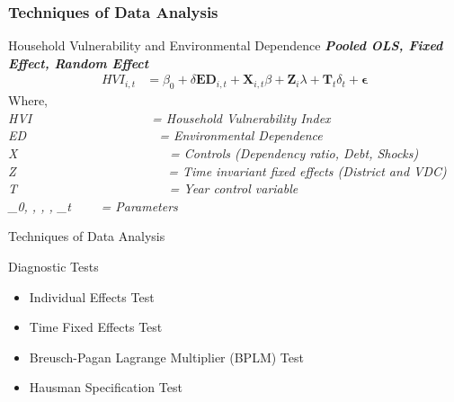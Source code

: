 \documentclass{beamer}
\begin{document}
	\begin{frame}
		\frametitle{Techniques of Data Analysis}
		\begin{block}{Household Vulnerability and Environmental Dependence}
			\textbf{\textit{Pooled OLS, Fixed Effect, Random Effect}}
			\begin{align}
				\mathit{HVI}_{i,t} &= \beta_{0} + \delta \mathit{\mathbf{ED}_{i,t}} + \mathbf{X}_{i,t} \beta + \mathbf{Z}_i \lambda + \mathbf{T}_t \delta_t + \boldsymbol{\epsilon}\tag{5}
			\end{align}
			Where,  
			\\
			\textit{HVI \ \ \ \ \ \ \ \ \ \ \ \ \ \ \ \ \ \ = Household Vulnerability Index}\\
			
			\textit{ED \ \ \ \ \ \ \ \ \ \ \ \ \ \ \ \ \ \ \ \ = Environmental Dependence}\\
			
			\textit{X \ \ \ \ \ \ \ \ \ \ \ \ \ \ \ \ \ \ \ \ \ \ \ = Controls (Dependency ratio, Debt, Shocks)}\\
			
			\textit{Z \ \ \ \ \ \ \ \ \ \ \ \ \ \ \ \ \ \ \ \ \ \ \  = Time invariant fixed effects (District and VDC)}\\
			
			\textit{T \ \ \ \ \ \ \ \ \ \ \ \ \ \ \ \ \ \ \ \ \ \ \ = Year control variable}\\
			
			\textit{ \beta_{0}, \delta, \beta, \lambda, \delta_t   \ \ \ \ = Parameters }\\
			\vspace{0.5cm}
		\end{block} 
	\end{frame}      
	
	\begin{frame}{Techniques of Data Analysis}
		\begin{exampleblock}{Diagnostic Tests}
			\begin{itemize}
				\item Individual Effects Test
				\item Time Fixed Effects Test
				\item  Breusch-Pagan Lagrange Multiplier (BPLM) Test
				\item  Hausman Specification Test
			\end{itemize}
		\end{exampleblock}
	\end{frame}
	
\end{document}

